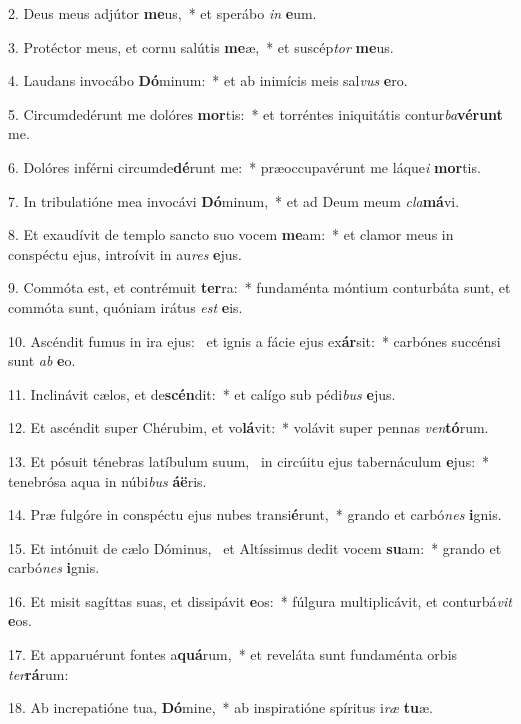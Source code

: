 2. Deus meus adjútor \textbf{me}us,~*  et sperábo \textit{in} \textbf{e}um.\

3. Protéctor meus, et cornu salútis \textbf{me}æ,~*  et suscép\textit{tor} \textbf{me}us.\

4. Laudans invocábo \textbf{Dó}minum:~*  et ab inimícis meis sal\textit{vus} \textbf{e}ro.\

5. Circumdedérunt me dolóres \textbf{mor}tis:~*  et torréntes iniquitátis contur\textit{ba}\textbf{vé}\textbf{runt} me.\

6. Dolóres inférni circumde\textbf{dé}runt me:~*  præoccupavérunt me láque\textit{i} \textbf{mor}tis.\

7. In tribulatióne mea invocávi \textbf{Dó}minum,~*  et ad Deum meum \textit{cla}\textbf{má}vi.\

8. Et exaudívit de templo sancto suo vocem \textbf{me}am:~*  et clamor meus in conspéctu ejus, introívit in au\textit{res} \textbf{e}jus.\

9. Commóta est, et contrémuit \textbf{ter}ra:~*  fundaménta móntium conturbáta sunt, et commóta sunt, quóniam irátus \textit{est} \textbf{e}is.\

10. Ascéndit fumus in ira ejus: \dag\  et ignis a fácie ejus ex\textbf{ár}sit:~*  carbónes succénsi sunt \textit{ab} \textbf{e}o.\

11. Inclinávit cælos, et de\textbf{scén}dit:~*  et calígo sub pédi\textit{bus} \textbf{e}jus.\

12. Et ascéndit super Chérubim, et vo\textbf{lá}vit:~*  volávit super pennas \textit{ven}\textbf{tó}rum.\

13. Et pósuit ténebras latíbulum suum, \dag\  in circúitu ejus tabernáculum \textbf{e}jus:~*  tenebrósa aqua in núbi\textit{bus} \textbf{á}\textbf{ë}ris.\

14. Præ fulgóre in conspéctu ejus nubes transi\textbf{é}runt,~*  grando et carbó\textit{nes} \textbf{i}gnis.\

15. Et intónuit de cælo Dóminus, \dag\  et Altíssimus dedit vocem \textbf{su}am:~*  grando et carbó\textit{nes} \textbf{i}gnis.\

16. Et misit sagíttas suas, et dissipávit \textbf{e}os:~*  fúlgura multiplicávit, et conturbá\textit{vit} \textbf{e}os.\

17. Et apparuérunt fontes a\textbf{quá}rum,~*  et reveláta sunt fundaménta orbis \textit{ter}\textbf{rá}rum:\

18. Ab increpatióne tua, \textbf{Dó}mine,~*  ab inspiratióne spíritus i\textit{ræ} \textbf{tu}æ.\

